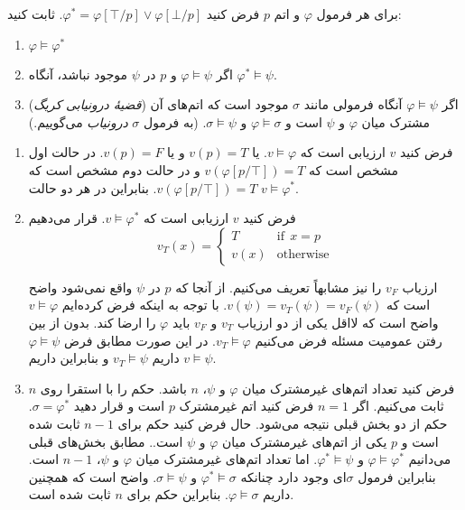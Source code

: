 برای هر فرمول $\varphi$ و اتم $p$ فرض کنید
$\varphi^*=\varphi[\top/p]\vee \varphi[\bot/p]$.
ثابت کنید:
\begin{enumerate}
\item
$\varphi\models \varphi^*$
\item
اگر
$\varphi\models \psi$
و $p$ در $\psi$ موجود نباشد، آنگاه
$\varphi^*\models \psi$.
\item
(\emph{قضیهٔ درونیابی کریگ})
اگر
$\varphi\models \psi$
آنگاه فرمولی مانند $\sigma$ موجود است که اتم‌های آن مشترک میان $\varphi$ و $\psi$ است و $\varphi\models \sigma$ و $\sigma\models \psi$.
(به فرمول $\sigma$ \emph{درونیاب} می‌گوییم.)
\end{enumerate}\quad\vspace{-1cm}
\begin{ans}
  \begin{enumerate}
  \item
  فرض کنید $v$ ارزیابی است که $v\models \varphi$. یا $v(p)=T$ و یا $v(p)=F$. در حالت اول مشخص است که
  $v(\varphi[p/\top])=T$
  و در حالت دوم مشخص است که
  $v(\varphi[p/\top])=T$.
  بنابراین در هر دو حالت
  $v\models \varphi^*$.

  \item
  فرض کنید $v$ ارزیابی است که $v\models \varphi^*$. قرار می‌دهیم
  $$
  v_T(x)=
  \begin{cases}
  T & \text{if}~~x=p\\
  v(x) & \text{otherwise}
  \end{cases}
  $$

  ارزیاب $v_F$ را نیز مشابهاً تعریف می‌کنیم. از آنجا که $p$ در $\psi$ واقع نمی‌شود واضح است که $v(\psi)=v_T(\psi)=v_F(\psi)$. با توجه به اینکه فرض کرده‌ایم $v\models \varphi$ واضح است که لااقل یکی از دو ارزیاب $v_T$ و $v_F$ باید $\varphi$ را ارضا کند. بدون از بین رفتن عمومیت مسئله فرض می‌کنیم $v_T\models \varphi$. در این صورت مطابق فرض $\varphi\models \psi$ داریم $v_T\models \psi$ و بنابراین داریم $v\models \psi$.

  \item
  فرض کنید تعداد اتم‌های غیرمشترک میان $\varphi$ و $\psi$، $n$ باشد. حکم را با استقرا روی $n$ ثابت می‌کنیم. اگر $n=1$ فرض کنید اتم غیرمشترک $p$ است و قرار دهید $\sigma=\varphi^*$. حکم از دو بخش قبلی نتیجه می‌شود. حال فرض کنید حکم برای $n-1$ ثابت شده است و $p$ یکی از اتم‌های غیرمشترک میان $\varphi$ و $\psi$ است.. مطابق بخش‌های قبلی می‌دانیم $\varphi\models \varphi^*$ و $\varphi^*\models \psi$. اما تعداد اتم‌های غیرمشترک میان $\varphi$ و $\psi$، $n-1$ است. بنابراین فرمول $\sigma$ای وجود دارد چنانکه $\varphi^*\models \sigma$ و $\sigma\models \psi$. واضح است که همچنین داریم $\varphi\models \sigma$. بنابراین حکم برای $n$ ثابت شده است.
  \end{enumerate}
\end{ans}